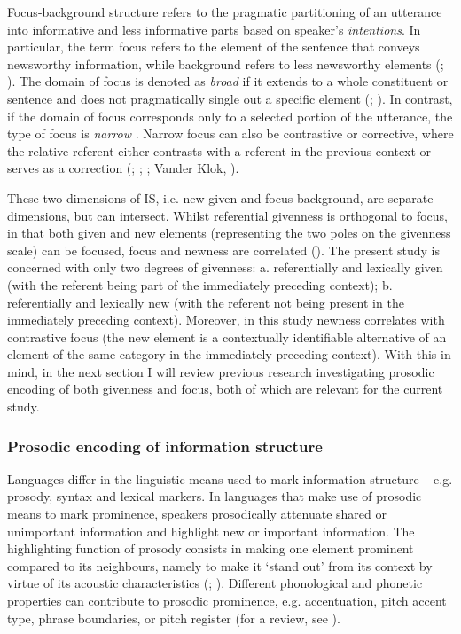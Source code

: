 Focus-background structure refers to the pragmatic partitioning of an utterance into informative and less informative parts based on speaker’s \textit{intentions}. In particular, the term focus refers to the element of the sentence that conveys newsworthy information, while background refers to less newsworthy elements (\citealt{Halliday1967}; \citealt{Kuno1978}). The domain of focus is denoted as \textit{broad} if it extends to a whole constituent or sentence and does not pragmatically single out a specific element (\citealt{Gussenhoven1983}; \citealt{Ladd2008}). In contrast, if the domain of focus corresponds only to a selected portion of the utterance, the type of focus is \textit{narrow} \citep{Ladd1980}. Narrow focus can also be contrastive or corrective, where the relative referent either contrasts with a referent in the previous context or serves as a correction (\citealt{Gussenhoven2008}; \citealt{KlassenEtAl2016}; \citealt{Krifka2008}; Vander Klok, \citealt{GoadWagner2018}).

These two dimensions of IS, i.e. new-given and focus-background, are separate dimensions, but can intersect. Whilst referential givenness is orthogonal to focus, in that both given and new elements (representing the two poles on the givenness scale) can be focused, focus and newness are correlated (\citealt{KüglerCalhoun2020}). The present study is concerned with only two degrees of givenness: a. referentially and lexically given (with the referent being part of the immediately preceding context); b. referentially and lexically new (with the referent not being present in the immediately preceding context). Moreover, in this study newness correlates with contrastive focus (the new element is a contextually identifiable alternative of an element of the same category in the immediately preceding context). With this in mind, in the next section I will review previous research investigating prosodic encoding of both givenness and focus, both of which are relevant for the current study.

\subsubsection{Prosodic encoding of information structure}
\hypertarget{Toc191305885}{}
Languages differ in the linguistic means used to mark information structure – e.g. prosody, syntax and lexical markers. In languages that make use of prosodic means to mark prominence, speakers prosodically attenuate shared or unimportant information and highlight new or important information. The highlighting function of prosody consists in making one element prominent compared to its neighbours, namely to make it ‘stand out’ from its context by virtue of its acoustic characteristics (\citealt{CangemiBaumann2020}; \citealt{Terken1991}). Different phonological and phonetic properties can contribute to prosodic prominence, e.g. accentuation, pitch accent type, phrase boundaries, or pitch register (for a review, see \citealt{KüglerCalhoun2020}).

